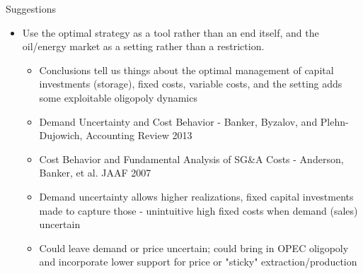 \documentclass[xcolor=table]{beamer}
\begin{document}
\begin{frame}{Suggestions}
	\begin{itemize}[<+->]
	\item Use the optimal strategy as a tool rather than an end itself, and the oil/energy market as a setting rather than a restriction.
	\begin{itemize}[<+->]
		\item Conclusions tell us things about the optimal management of capital investments (storage), fixed costs, variable costs, 
		and the setting adds some exploitable oligopoly dynamics
		\item Demand Uncertainty and Cost Behavior - Banker, Byzalov, and Plehn-Dujowich, Accounting Review 2013
		\item Cost Behavior and Fundamental Analysis of SG\&A Costs - Anderson, Banker, et al. JAAF 2007
		\item Demand uncertainty allows higher realizations, fixed capital investments made to capture those - unintuitive high fixed costs when demand (sales) uncertain
		\item Could leave demand or price uncertain; could bring in OPEC oligopoly and incorporate lower support for price or "sticky" extraction/production
	\end{itemize}
\end{itemize}
\end{frame}
\end{document}
